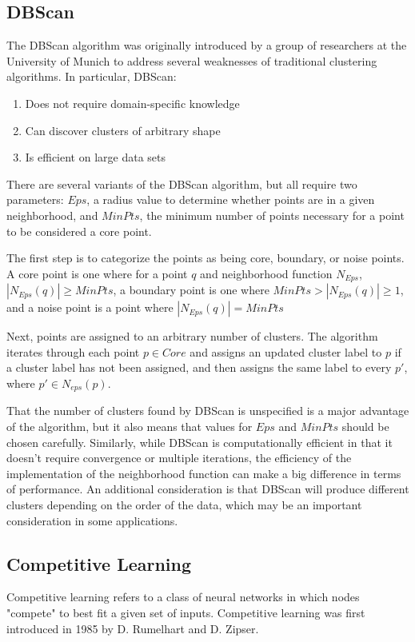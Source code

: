 \documentclass[12pt]{article}
\begin{document}
\subsection{DBScan}

The DBScan algorithm was originally introduced by a group of researchers at the University of Munich to address several weaknesses of traditional clustering algorithms.  In particular, DBScan:

\begin{enumerate}
\item Does not require domain-specific knowledge
\item Can discover clusters of arbitrary shape
\item Is efficient on large data sets
\end{enumerate}

There are several variants of the DBScan algorithm, but all require two parameters: $Eps$, a radius value to determine whether points are in a given neighborhood, and $MinPts$, the minimum number of points necessary for a point to be considered a core point.

The first step is to categorize the points as being core, boundary, or noise points.  A core point is one where for a point $q$ and neighborhood function $N_{Eps}$, $|N_{Eps}(q)|\geq MinPts$, a boundary point is one where $MinPts>|N_{Eps}(q)|\geq 1$, and a noise point is a point where $|N_{Eps}(q)|= MinPts$

Next, points are assigned to an arbitrary number of clusters.  The algorithm iterates through each point $p \in Core$ and assigns an updated cluster label to $p$ if a cluster label has not been assigned, and then assigns the same label to every $p'$, where $p' \in N_{eps}(p)$.

That the number of clusters found by DBScan is unspecified is a major advantage of the algorithm, but it also means that values for $Eps$ and $MinPts$ should be chosen carefully.  Similarly, while DBScan is computationally efficient in that it doesn't require convergence or multiple iterations, the efficiency of the implementation of the neighborhood function can make a big difference in terms of performance.  An additional consideration is that DBScan will produce different clusters depending on the order of the data, which may be an important consideration in some applications.

\subsection{Competitive Learning}
Competitive learning refers to a class of neural networks in which nodes "compete" to best fit a given set of inputs.  Competitive learning was first introduced in 1985 by D. Rumelhart and D. Zipser.  
\end{document}
